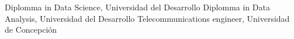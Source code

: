 %
%
%


\begin{scholarship}
					{Diplomma in Data Science, Universidad del Desarrollo}
					{Diplomma in Data Analysis, Universidad del Desarrollo}
					{Telecommunications engineer, Universidad de Concepción}
\end{scholarship}
